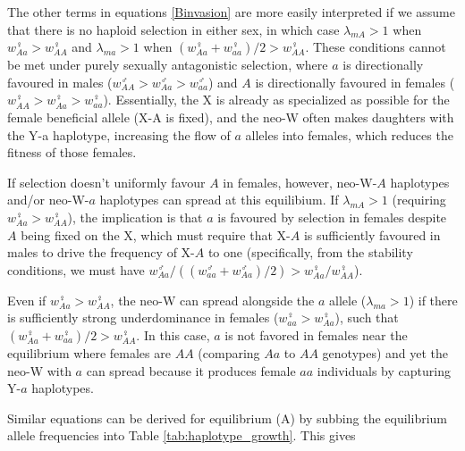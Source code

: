 \documentclass[12pt]{article}
\begin{document}
The other terms in equations \eqref{Binvasion} are more easily interpreted if we assume that there is no haploid selection in either sex, in which case $\lambda_{mA}>1$ when $w_{Aa}^\female>w_{AA}^\female$ and $\lambda_{ma}>1$ when $(w_{Aa}^\female+w_{aa}^\female)/2>w_{AA}^\female$.
These conditions cannot be met under purely sexually antagonistic selection, where $a$ is directionally favoured in males ($w_{AA}^\male>w_{Aa}^\male>w_{aa}^\male$) and $A$ is directionally favoured in females ($w_{AA}^\female>w_{Aa}^\female>w_{aa}^\female$).  
Essentially, the X is already as specialized as possible for the female beneficial allele (X-A is fixed), and the neo-W often makes daughters with the Y-a haplotype, increasing the flow of $a$ alleles into females, which reduces the fitness of those females.  

If selection doesn't uniformly favour $A$ in females, however, neo-W-$A$ haplotypes and/or neo-W-$a$ haplotypes can spread at this equilibium.
If $\lambda_{mA}>1$ (requiring $w_{Aa}^\female>w_{AA}^\female$), the implication is that $a$ is favoured by selection in females despite $A$ being fixed on the X, which must require that X-$A$ is sufficiently favoured in males to drive the frequency of X-$A$ to one (specifically, from the stability conditions, we must have $w_{Aa}^\male/((w_{aa}^\male+w_{Aa}^\male)/2)>w_{Aa}^\female/w_{AA}^\female$).

Even if $w_{Aa}^\female>w_{AA}^\female$, the neo-W can spread alongside the $a$ allele ($\lambda_{ma}>1$) if there is sufficiently strong underdominance in females ($w_{aa}^\female>w_{Aa}^\female$), such that $(w_{Aa}^\female+w_{aa}^\female)/2>w_{AA}^\female$.  
In this case, $a$ is not favored in females near the equilibrium where females are $AA$ (comparing $Aa$ to $AA$ genotypes) and yet the neo-W with $a$ can spread because it produces female $aa$ individuals by capturing Y-$a$ haplotypes.





Similar equations can be derived for equilibrium (A) by subbing the equilibrium allele frequencies into Table \ref{tab:haplotype_growth}.
This gives
\end{document}
